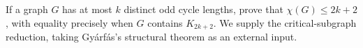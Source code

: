 If a graph $G$ has at most $k$ distinct odd cycle lengths, prove that $\chi(G)\le2k+2$, with equality precisely when $G$ contains $K_{2k+2}$. We supply the critical-subgraph reduction, taking Gy\'arf\'as's structural theorem as an external input.
